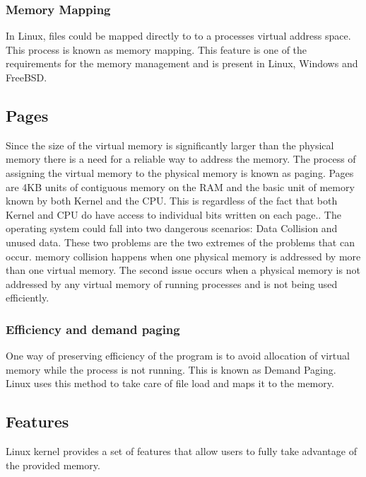 \documentclass[journal,10pt,onecolumn,compsoc,letterpaper,draftclsnofoot,table,xcdraw]{IEEEtran} \usepackage[margin=0.75in]{geometry}
\begin{document}
\subsubsection{Memory Mapping}
\noindent In Linux, files could be mapped directly to to a processes virtual address space. This process is known as memory mapping. This feature is one of the requirements for the memory management and is present in Linux, Windows and FreeBSD.\cite{1}
\subsection{Pages}
\noindent Since the size of the virtual memory is significantly larger than the physical memory there is a need for a reliable way to address the memory. The process of assigning the virtual memory to the physical memory is known as paging. Pages are 4KB units of contiguous memory on the RAM and the basic unit of memory known by both Kernel and the CPU. This is regardless of the fact that both Kernel and CPU do have access to individual bits written on each page.\cite{2}. The operating system could fall into two dangerous scenarios: Data Collision and unused data. These two problems are the two extremes of the problems that can occur. memory collision happens when one physical memory is addressed by more than one virtual memory. The second issue occurs when a physical memory is not addressed by any virtual memory of running processes and is not being used efficiently.\cite{1}
\subsubsection{Efficiency and demand paging}
\noindent One way of preserving efficiency of the program is to avoid allocation of virtual memory while the process is not running. This is known as Demand Paging. Linux uses this method to take care of file load and maps it to the memory.\cite{1}
\subsection{Features}
\noindent Linux kernel provides a set of features that allow users to fully take advantage of the provided memory.
\end{document}

